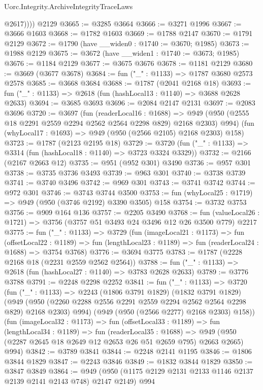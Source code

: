 \begin{lexlean}{Uorc.Integrity.ArchiveIntegrityTraceLaws}
\begin{coremodule}
            @2617))))
    @2129
@3665 := @3285 @3664
@3666 := @3271 @1996
@3667 := @3666 @1603
@3668 := @1782 @1603
@3669 := @1788 @2147
@3670 := @1791 @2129
@3672 := @1790 (have __widen0 : @1740 := @3670; @1985)
@3673 := @1988 @2129
@3675 := @3672 (have __widen1 : @1740 := @3673; @1985)
@3676 := @1184 @2129
@3677 := @3675 @3676
@3678 := @1181 @2129
@3680 := @3669 (@3677 @3678)
@3684 := fun ("_" : @1133) => @1787 @3680 @2573 @2578
@3685 := @3668 @3684
@3688 := @1787 (@2041 @2168 @18)
@3693 := fun ("_" : @1133) => @2618 (fun (hashLocal13 : @1140) => @3688 @2628 @2633)
@3694 := @3685 @3693
@3696 := @2084 @2147 @2131
@3697 := @2083 @3696
@3720 := @3697
    (fun (readerLocal16 : @1688) =>
    @949 (@950 (@2555 @18 @2291 @2559 @2294 @2562 @2564 @2298 @829) @2168 @2303) @994)
    (fun (whyLocal17 : @1693) => @949 (@950 (@2566 @2105) @2168 @2303) @158)
@3723 := @1787 (@2123 @2195 @18)
@3729 := @3720 (fun ("_" : @1133) => @3314 (fun (hashLocal18 : @1140) => @3723 @3324 @3329))
@3732 := @2166 (@2167 @2663 @12)
@3735 := @951 (@952 @301) @3490
@3736 := @957 @301
@3738 := @3735 @3736 @3493
@3739 := @963 @301
@3740 := @3738 @3739
@3741 := @3740 @3496
@3742 := @969 @301
@3743 := @3741 @3742
@3744 := @972 @301
@3746 := @3743 @3744 @3500
@3753 := fun (whyLocal25 : @1719) => @949 (@950 (@3746 @2192) @3390 @3505) @158
@3754 := @3732 @3753
@3756 := @909 @164 @136
@3757 := @2205 @3490
@3768 := fun (valueLocal26 : @1721) => @3756 (@3757 @51 @3493 @24 @3496 @12 @26 @3500 @779) @2217
@3775 := fun ("_" : @1133) =>
  @3729
    (fun (imageLocal21 : @1173) =>
    fun (offsetLocal22 : @1189) =>
    fun (lengthLocal23 : @1189) => fun (readerLocal24 : @1688) => @3754 @3768)
@3776 := @3694 @3775
@3783 := @1787 (@2228 @2168 @18 (@2231 @2559 @2562 @2564))
@3788 := fun ("_" : @1133) => @2618 (fun (hashLocal27 : @1140) => @3783 @2628 @2633)
@3789 := @3776 @3788
@3791 := @2248 @2298 @2252
@3841 := fun ("_" : @1133) =>
  @3720
    (fun ("_" : @1133) =>
    @2243
      (@1806 @3791 @1829)
      (@1832 @3791 @1829)
      (@949 (@950 (@2260 @2288 @2556 @2291 @2559 @2294 @2562 @2564 @2298 @829) @2168 @2303) @994)
      (@949 (@950 (@2566 @2277) @2168 @2303) @158))
    (fun (imageLocal32 : @1173) =>
    fun (offsetLocal33 : @1189) =>
    fun (lengthLocal34 : @1189) =>
    fun (readerLocal35 : @1688) =>
    @949 (@950 (@2287 @2645 @18 @2649 @12 @2653 @26 @51 @2659 @795) @2663 @2665) @994)
@3842 := @3789 @3841
@3844 := @2248 @2141 @1195
@3846 := @1806 @3844 @1829
@3847 := @2243 @3846
@3849 := @1832 @3844 @1829
@3850 := @3847 @3849
@3864 := @949 (@950 (@1175 @2129 @2131 @2133 @1146 @2137 @2139 @2141 @2143 @748) @2147 @2149) @994

\end{coremodule}
\end{lexlean}
